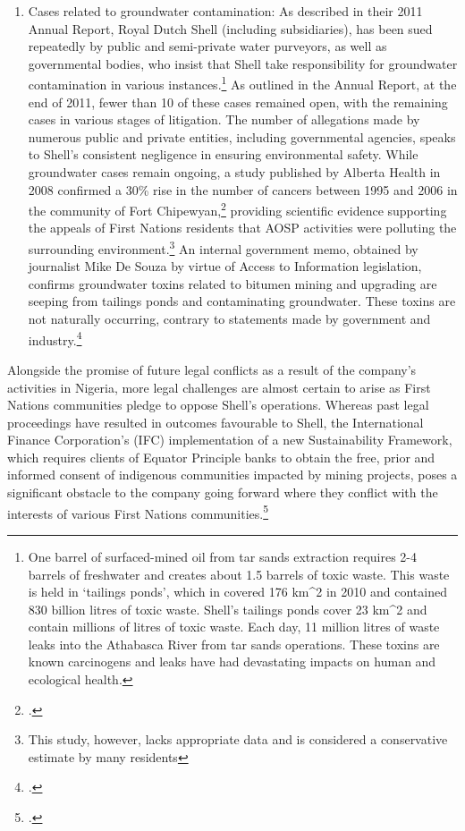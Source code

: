\begin{enumerate}
	\item Cases related to groundwater contamination: As described in their 2011 Annual Report, Royal Dutch Shell (including subsidiaries), has been sued repeatedly by public and semi-private water purveyors, as well as governmental bodies, who insist that Shell take responsibility for groundwater contamination in various instances.\footnote{One barrel of surfaced-mined oil from tar sands extraction requires 2-4 barrels of freshwater and creates about 1.5 barrels of toxic waste. This waste is held in `tailings ponds', which in covered 176 km^2 in 2010 and contained 830 billion litres of toxic waste. Shell's tailings ponds cover 23 km^2 and contain millions of litres of toxic waste. Each day, 11 million litres of waste leaks into the Athabasca River from tar sands operations. These toxins are known carcinogens and leaks have had devastating impacts on human and ecological health.} As outlined in the Annual Report, at the end of 2011, fewer than 10 of these cases remained open, with the remaining cases in various stages of litigation. The number of allegations made by numerous public and private entities, including governmental agencies, speaks to Shell's consistent negligence in ensuring environmental safety. While groundwater cases remain ongoing, a study published by Alberta Health in 2008 confirmed a 30\% rise in the number of cancers between 1995 and 2006 in the community of Fort Chipewyan,\footcite[][]{RiskingRuin_2012} providing scientific evidence supporting the appeals of First Nations residents that AOSP activities were polluting the surrounding environment.\footnote{This study, however, lacks appropriate data and is considered a conservative estimate by many residents} An internal government memo, obtained by journalist Mike De Souza by virtue of Access to Information legislation, confirms groundwater toxins related to bitumen mining and upgrading are seeping from tailings ponds and contaminating groundwater. These toxins are not naturally occurring, contrary to statements made by government and industry.\footcite[][]{Memorandum_2012} 
\end{enumerate}


Alongside the promise of future legal conflicts as a result of the company's activities in Nigeria, more legal challenges are almost certain to arise as First Nations communities pledge to oppose Shell's operations. 
Whereas past legal proceedings have resulted in outcomes favourable to Shell, the International Finance Corporation's (IFC) implementation of a new Sustainability Framework, which requires clients of Equator Principle banks to obtain the free, prior and informed consent of indigenous communities impacted by mining projects, poses a significant obstacle to the company going forward where they conflict with the interests of various First Nations communities.\footcite[][]{Sosa_2011}



